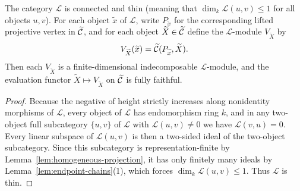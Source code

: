 \begin{lemma}
\label{lem:lifted-projective-evaluation}
The category $\mathcal L$ is connected and thin (meaning that
$\dim_k\mathcal L(u,v)\leq1$ for all objects $u,v$). For each object
$\widetilde x$ of $\mathcal L$, write $P_{\widetilde x}$ for the
corresponding lifted projective vertex in $\widetilde{\mathcal C}$, and for each object
$\widetilde X\in\widetilde{\mathcal C}$ define the $\mathcal L$-module
$V_{\widetilde X}$ by
\[
 V_{\widetilde X}(\widetilde x)=\widetilde{\mathcal C}(P_{\widetilde x},\widetilde X).
\]
Then each $V_{\widetilde X}$ is a finite-dimensional indecomposable
$\mathcal L$-module, and the evaluation functor
$\widetilde X\mapsto V_{\widetilde X}$ on $\widetilde{\mathcal C}$ is fully faithful.
\end{lemma}
\begin{proof}
Because the negative of height strictly increases along nonidentity morphisms
of $\mathcal L$, every object of $\mathcal L$ has endomorphism ring $k$, and
in any two-object full subcategory $\{u,v\}$ of $\mathcal L$ with
$\mathcal L(u,v)\ne0$ we have $\mathcal L(v,u)=0$. Every linear subspace of
$\mathcal L(u,v)$ is then a two-sided ideal of the two-object subcategory.
Since this subcategory is representation-finite by
Lemma~\ref{lem:homogeneous-projection}, it has only finitely many ideals by
Lemma~\ref{lem:endpoint-chains}(1), which forces $\dim_k\mathcal L(u,v)\leq1$.
Thus $\mathcal L$ is thin.


\end{proof}
